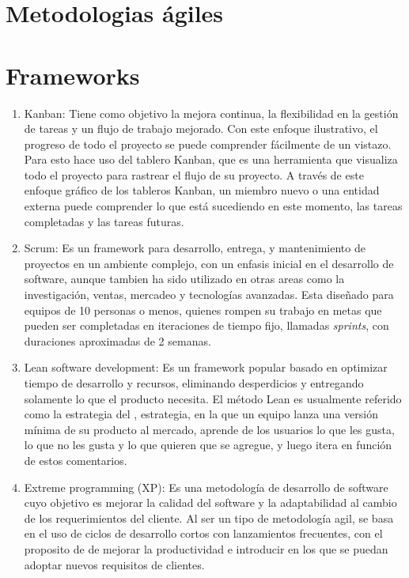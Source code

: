 \section{Metodologias ágiles}

    \section{Frameworks}

    \begin{enumerate}
        \item Kanban: Tiene como objetivo la mejora continua, la flexibilidad en la gestión de tareas y un flujo de trabajo mejorado. Con este enfoque ilustrativo, el progreso de todo el proyecto se puede comprender fácilmente de un vistazo. Para esto hace uso del tablero Kanban, que es una herramienta que visualiza todo el proyecto para rastrear el flujo de su proyecto. A través de este enfoque gráfico de los tableros Kanban, un miembro nuevo o una entidad externa puede comprender lo que está sucediendo en este momento, las tareas completadas y las tareas futuras.
        \item Scrum: Es un framework para desarrollo, entrega, y mantenimiento de proyectos en un ambiente complejo, con un enfasis inicial en el desarrollo de software, aunque tambien ha sido utilizado en otras areas como la investigación, ventas, mercadeo y tecnologías avanzadas. Esta diseñado para equipos de 10 personas o menos, quienes rompen su trabajo en metas que pueden ser completadas en iteraciones de tiempo fijo, llamadas \emph{sprints}, con duraciones aproximadas de 2 semanas. 
        \item Lean software development: Es un framework popular basado en optimizar tiempo de desarrollo y recursos, eliminando desperdicios y entregando solamente lo que el producto necesita. El método Lean es usualmente referido como la estrategia del , 
        estrategia, en la que un equipo lanza una versión mínima de su producto al mercado, aprende de los usuarios lo que les gusta, lo que no les gusta y lo que quieren que se agregue, y luego itera en función de estos comentarios.
        \item Extreme programming (XP): Es una metodología de desarrollo de software cuyo objetivo es mejorar la calidad del software y la adaptabilidad al cambio de los requerimientos del cliente. Al ser un tipo de metodología agil, se basa en el uso de ciclos de desarrollo cortos con lanzamientos frecuentes, con el proposito de de mejorar la productividad e introducir  en los que se puedan adoptar nuevos requisitos de clientes.

\end{enumerate}
